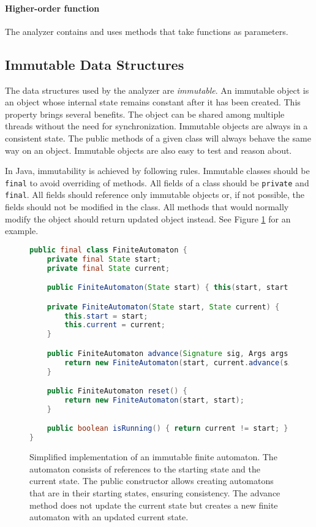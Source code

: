 \paragraph{Higher-order function}
The analyzer contains and uses methods that take functions as parameters.

\subsection{Immutable Data Structures}

The data structures used by the analyzer are \emph{immutable}. An immutable
object is an object whose internal state remains constant after it has been
created.  This property brings several benefits. The object can be shared among
multiple threads without the need for synchronization. Immutable objects are
always in a consistent state. The public methods of a given class will always
behave the same way on an object. Immutable objects are also easy to test and
reason about.

In Java, immutability is achieved by following rules. Immutable classes should
be \texttt{final} to avoid overriding of methods. All fields of a class
should be \texttt{private} and \texttt{final}. All fields should reference only
immutable objects or, if not possible, the fields should not be modified in the
class. All methods that would normally modify the object should return updated
object instead. See Figure \ref{immutable} for an example.

\begin{figure}[hbt]
    \label{immutable}
    \begin{lstlisting}[language=java]
public final class FiniteAutomaton {
    private final State start;
    private final State current;

    public FiniteAutomaton(State start) { this(start, start); }

    private FiniteAutomaton(State start, State current) {
        this.start = start;
        this.current = current;
    }

    public FiniteAutomaton advance(Signature sig, Args args) {
        return new FiniteAutomaton(start, current.advance(sig, args));
    }

    public FiniteAutomaton reset() {
        return new FiniteAutomaton(start, start);
    }

    public boolean isRunning() { return current != start; }
}
\end{lstlisting}
    \caption{Simplified implementation of an immutable finite automaton. The
    automaton consists of references to the starting state and the current
    state. The public constructor allows creating automatons that are in their
    starting states, ensuring consistency. The advance method does not update
    the current state but creates a new finite automaton with an updated current
    state.}
\end{figure}

